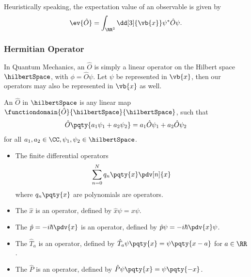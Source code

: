 Heuristically speaking, the expectation value of an observable is given by
\begin{equation}
    \ev{\hat{O}} = \int_{\RR^3} \dd[3]{\vb{x}} \psi^{\ast} \hat{O} \psi.
\end{equation}

\subsubsection{Hermitian Operator}

In Quantum Mechanics, an  \(\hat{O}\) is simply a linear operator on the Hilbert space \(\hilbertSpace\), with \(\phi = \hat{O} \psi\). Let \(\psi\) be represented in \(\vb{x}\), then our operators may also be represented in \(\vb{x}\) as well.

\begin{definition}
    An  \(\hat{O}\) in \(\hilbertSpace\) is any linear map \(\functiondomain{\hat{O}}{\hilbertSpace}{\hilbertSpace}\), such that
    \begin{equation}
        \hat{O} \pqty{a_1 \psi_1 + a_2 \psi_2} = a_1 \hat{O} \psi_1 + a_2 \hat{O} \psi_2
    \end{equation}
    for all \(a_1, a_2 \in \CC, \psi_1, \psi_2 \in \hilbertSpace\).
\end{definition}

\begin{examples}
    \begin{itemize}
        \item The finite differential operators
        \[
            \sum_{n = 0}^{N} q_n\pqty{x} \pdv[n]{x}
        \]
        where \(q_n \pqty{x}\) are polynomials are operators.
        \item The  \(\hat{x}\) is an operator, defined by \(\hat{x} \psi = x \psi\).
        \item The  \(\hat{p} = - i \hbar \pdv{x}\) is an operator, defined by \(\hat{p} \psi = - i \hbar \pdv{x} \psi\).
        \item The  \(\hat{T}_a\) is an operator, defined by \(\hat{T}_a \psi \pqty{x} = \psi\pqty{x - a}\) for \(a \in \RR\).
        \item The  \(\hat{P}\) is an operator, defined by \(\hat{P} \psi \pqty{x} = \psi\pqty{-x}\).
    \end{itemize}
\end{examples}


